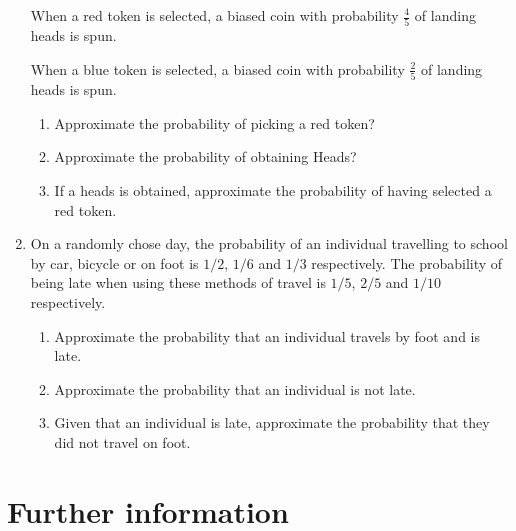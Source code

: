 \begin{enumerate}
When a red token is selected, a biased coin with probability \(\frac{4}{5}\) of landing heads is spun.


When a blue token is selected, a biased coin with probability \(\frac{2}{5}\) of landing heads is spun.
\begin{enumerate}

\item 

Approximate the probability of picking a red token?

\item 

Approximate the probability of obtaining Heads?

\item 

If a heads is obtained, approximate the probability of having selected a red token.

\end{enumerate}

\item 

On a randomly chose day, the probability of an individual travelling to school by car, bicycle or on foot is \(1/2\), \(1/6\) and \(1/3\) respectively. The probability of being late when using these methods of travel is \(1/5\), \(2/5\) and \(1/10\) respectively.
\begin{enumerate}

\item 

Approximate the probability that an individual travels by foot and is late.

\item 

Approximate the probability that an individual is not late.

\item 

Given that an individual is late, approximate the probability that they did not travel on foot.

\end{enumerate}

\end{enumerate}


\section{Further information}
\label{\detokenize{tools-for-mathematics/06-probability/why/main:further-information}}\label{\detokenize{tools-for-mathematics/06-probability/why/main::doc}}


